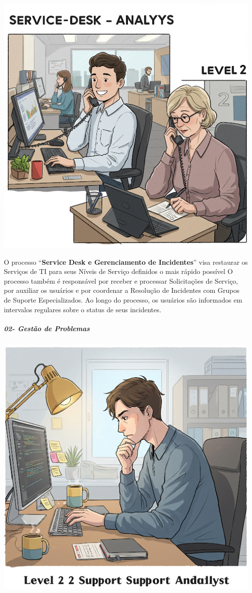 \documentclass[
]{book}
\begin{document}
\includegraphics{images/InfraEstrutura/ITIL/01-Gerencia_de_Incidentes-2.jpg}

O processo ``\textbf{Service Desk e Gerenciamento de Incidentes}'' visa restaurar os Serviços de TI para seus Níveis de Serviço definidos o mais rápido possível O processo também é responsável por receber e processar Solicitações de Serviço, por auxiliar os usuários e por coordenar a Resolução de Incidentes com Grupos de Suporte Especializados. Ao longo do processo, os usuários são informados em intervalos regulares sobre o status de seus incidentes.

\subparagraph{02- Gestão de Problemas}\label{gestuxe3o-de-problemas}

\includegraphics{images/InfraEstrutura/ITIL/02-Gerencia_de_Problemas.jpg}
\end{document}
